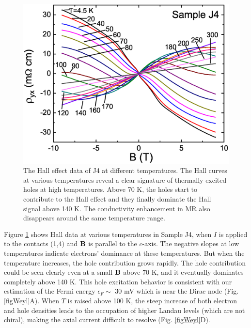 \begin{figure}[!htbp]
  \begin{center}
\includegraphics[width=0.8\linewidth]{ch-na3bi/figures/FigJ4Hall.eps}
\caption{\label{J4Hall} The Hall effect data of J4 at different temperatures. The Hall curves at various temperatures reveal a clear signature of thermally excited holes at high temperatures. Above 70 K, the holes start to contribute to the Hall effect and they finally dominate the Hall signal above 140 K. The conductivity enhancement in MR also disappears around the same temperature range.}
  \end{center}
\end{figure}

Figure \ref{J4Hall} shows Hall data at various temperatures in Sample J4, when $I$ is applied to the contacts (1,4) and $\bf{B}$ is parallel to the $c$-axis. The negative slopes at low temperatures indicate electrons' dominance at these temperatures. But when the temperature increases, the hole contribution grows rapidly. The hole contribution could be seen clearly even at a small $\bf{B}$ above 70 K, and it eventually dominates completely above 140 K. This hole excitation behavior is consistent with our estimation of the Fermi energy $\epsilon_F\sim$ 30 mV which is near the Dirac node (Fig. \ref{figWeyl}A). When $T$ is raised above 100 K, the steep increase of both electron and hole densities leads  to the occupation of higher Landau levels (which are not chiral), making the axial current difficult to resolve (Fig. \ref{figWeyl}D).

